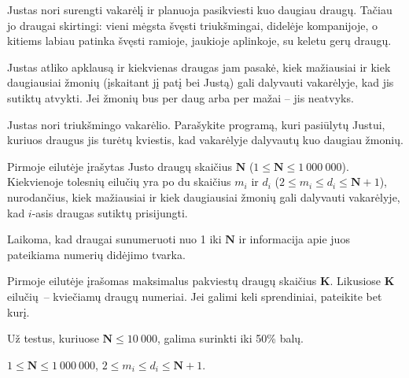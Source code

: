\documentclass{liostyle}
\newcommand{\maxN}{1\ 000\ 000}
\begin{document}
Justas nori surengti vakarėlį ir planuoja pasikviesti kuo 
daugiau draugų. Tačiau jo draugai skirtingi: vieni mėgsta 
švęsti triukšmingai, didelėje kompanijoje, o kitiems labiau 
patinka švęsti ramioje, jaukioje aplinkoje, su keletu gerų 
draugų.

Justas atliko apklausą ir kiekvienas draugas jam pasakė, kiek 
mažiausiai ir kiek daugiausiai žmonių (įskaitant jį patį bei 
Justą) gali dalyvauti vakarėlyje, kad jis sutiktų atvykti. Jei
žmonių bus per daug arba per mažai – jis neatvyks.

\Task
Justas nori triukšmingo vakarėlio. Parašykite programą, kuri pasiūlytų 
Justui, kuriuos draugus jis turėtų kviestis, kad vakarėlyje dalyvautų kuo daugiau 
žmonių.

\Input
Pirmoje eilutėje įrašytas Justo draugų skaičius $\mathbf{N}$
($1 \le \mathbf{N} \le \maxN$). Kiekvienoje tolesnių eilučių yra po du skaičius
$m_i$ ir $d_i$ ($2\le m_i\le d_i\le \mathbf{N}+1$), nurodančius, kiek
mažiausiai ir kiek daugiausiai žmonių gali dalyvauti vakarėlyje, kad $i$-asis
draugas sutiktų prisijungti.

Laikoma, kad draugai sunumeruoti nuo 1 iki $\mathbf{N}$ ir informacija apie
juos pateikiama numerių didėjimo tvarka.

\Output
Pirmoje eilutėje įrašomas maksimalus pakviestų draugų skaičius $\mathbf{K}$.
Likusiose $\mathbf{K}$ eilučių~-- kviečiamų draugų numeriai. Jei galimi keli sprendiniai,
pateikite bet kurį.

\Examples
{}

\Grading
Už testus, kuriuose $\mathbf{N} \le 10\ 000$, galima surinkti iki 50\% balų.

\Constraints
$1 \le \mathbf{N} \le \maxN$,\enskip
$2\le m_i\le d_i\le \mathbf{N}+1$.
\end{document}
